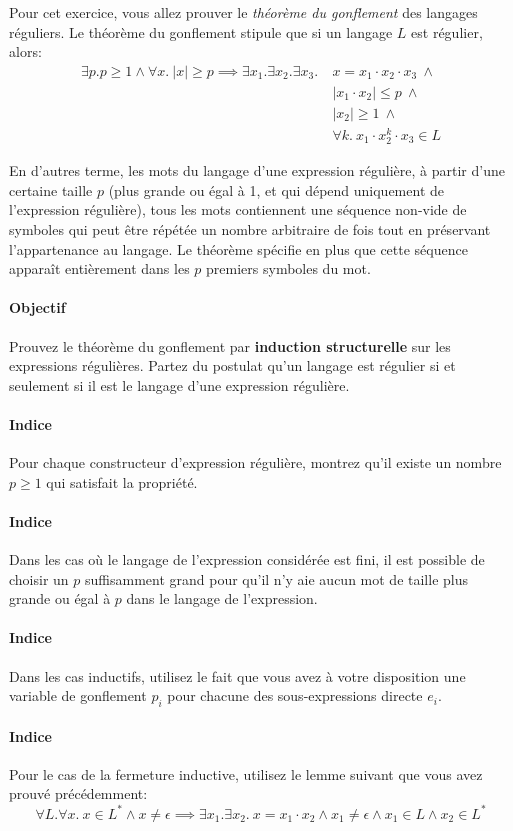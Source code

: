 \documentclass[12pt,french,a4paper]{article}
\begin{document}
\begin{question}
Pour cet exercice, vous allez prouver le \textit{théorème du gonflement} des langages réguliers.
Le théorème du gonflement stipule que si un langage $L$ est régulier, alors:
\begin{align*}
\exists p. p \geq 1 \wedge \forall x.\ |x| \geq p \implies \exists x_1. \exists x_2. \exists x_3.\ &x = x_1 \cdot x_2 \cdot x_3\ \wedge\\
&|x_1 \cdot x_2| \leq p\ \wedge\\
&|x_2| \geq 1\ \wedge\\
&\forall k.\ x_1 \cdot x_2^k \cdot x_3 \in L
\end{align*}

En d'autres terme, les mots du langage d'une expression régulière, à partir d'une certaine taille $p$ (plus grande ou égal à 1, et qui dépend uniquement de l'expression régulière), tous les mots contiennent une séquence non-vide de symboles qui peut être répétée un nombre arbitraire de fois tout en préservant l'appartenance au langage.
Le théorème spécifie en plus que cette séquence apparaît entièrement dans les $p$ premiers symboles du mot. 

\paragraph{Objectif} Prouvez le théorème du gonflement par \textbf{induction structurelle} sur les expressions régulières.
Partez du postulat qu'un langage est régulier si et seulement si il est le langage d'une expression régulière.

\paragraph{Indice} Pour chaque constructeur d'expression régulière, montrez qu'il existe un nombre $p \geq 1$ qui satisfait la propriété.

\paragraph{Indice} Dans les cas où le langage de l'expression considérée est fini, il est possible de choisir un $p$ suffisamment grand pour qu'il n'y aie aucun mot de taille plus grande ou égal à $p$ dans le langage de l'expression.

\paragraph{Indice} Dans les cas inductifs, utilisez le fait que vous avez à votre disposition une variable de gonflement $p_i$ pour chacune des sous-expressions directe $e_i$.

\paragraph{Indice} Pour le cas de la fermeture inductive, utilisez le lemme suivant que vous avez prouvé précédemment:
\[
\forall L. \forall x.\ x \in L^* \wedge x \neq \epsilon \implies \exists x_1. \exists x_2.\ x = x_1 \cdot x_2 \wedge x_1 \neq \epsilon \wedge x_1 \in L \wedge x_2 \in L^* 
\]
\end{question}
\end{document}
